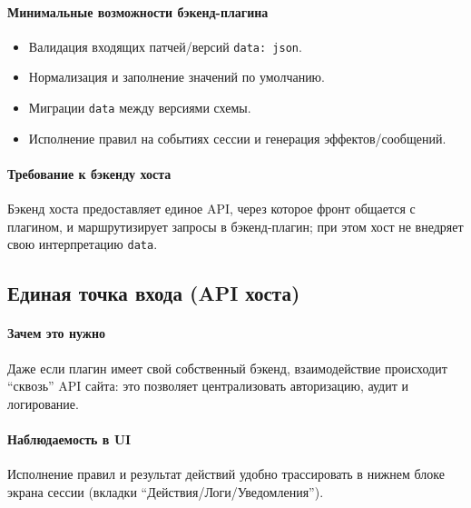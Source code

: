 \paragraph{Минимальные возможности бэкенд-плагина}
\begin{itemize}
\item Валидация входящих патчей/версий \texttt{data: json}.
\item Нормализация и заполнение значений по умолчанию.
\item Миграции \texttt{data} между версиями схемы.
\item Исполнение правил на событиях сессии и генерация эффектов/сообщений.
\end{itemize}

\paragraph{Требование к бэкенду хоста}
Бэкенд хоста предоставляет единое API, через которое фронт общается с плагином, и маршрутизирует запросы в бэкенд-плагин; при этом хост не внедряет свою интерпретацию \texttt{data}. 

\subsection{Единая точка входа (API хоста)}\label{subsec:rules-and-plugins:contracts:host-api}

\paragraph{Зачем это нужно}
Даже если плагин имеет свой собственный бэкенд, взаимодействие происходит ``сквозь'' API сайта: это позволяет централизовать авторизацию, аудит и логирование. 

\paragraph{Наблюдаемость в UI}
Исполнение правил и результат действий удобно трассировать в нижнем блоке экрана сессии (вкладки ``Действия/Логи/Уведомления''). 
